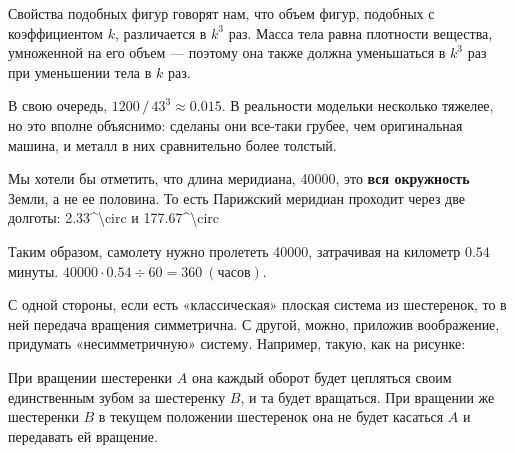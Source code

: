 ﻿
\begin{itemize}
\itA Свойства подобных фигур говорят нам, что объем фигур, подобных с коэффициентом $k$, различается в $k^3$ раз. Масса тела равна плотности вещества, умноженной на его объем — поэтому она также должна уменьшаться в $k^3$ раз при уменьшении тела в $k$ раз.

В свою очередь, $1200\,/\,43^3 \approx 0.015$. В реальности модельки несколько тяжелее, но это вполне объяснимо: сделаны они все-таки грубее, чем оригинальная машина, и металл в них сравнительно более толстый.

\itB Мы хотели бы отметить, что длина меридиана, \SI{40000}{}, это {\bfseries вся окружность} Земли, а не ее половина. То есть Парижский меридиан проходит через две долготы: \SI{2.33^\circ}{} и \SI{177.67^\circ}{}

Таким образом, самолету нужно пролететь \SI{40000}{}, затрачивая на километр $0.54$ минуты. $40000 \cdot 0.54 \div 60 = \SI{360}{(\text{часов})}$.

\itC С одной стороны, если есть «классическая» плоская система из шестеренок, то в ней передача вращения симметрична. С другой, можно, приложив воображение, придумать «несимметричную» систему. Например, такую, как на рисунке:

\begin{center}

\end{center}

При вращении шестеренки $A$ она каждый оборот будет цепляться своим единственным зубом за шестеренку $B$, и та будет вращаться. При вращении же шестеренки $B$ в текущем положении шестеренок она не будет касаться $A$ и передавать ей вращение.

\end{itemize}